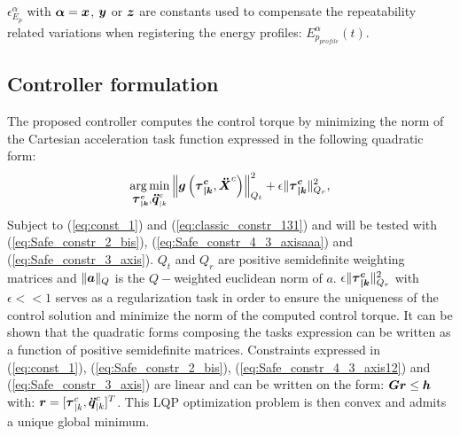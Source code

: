 \documentclass[letterpaper, 10 pt, conference]{ieeeconf}      %
\newcommand{\vect}[1]{\mbox{\boldmath${#1}$}}%
\DeclareMathOperator*{\argmin}{arg\,min}
\begin{document}
$\epsilon_{E_p}^{\alpha}$ with $\vect{\alpha} = \vect{x}$, $\vect{y}$ or $\vect{z}$ are constants used to compensate the repeatability related variations when registering the energy profiles: $E_{p_{profile}}^{\alpha}(t)$.
\subsection{Controller formulation}
\label{subsec:cntrl_frml}
The proposed controller computes the control torque by minimizing the norm of the Cartesian acceleration task function expressed in the following quadratic form: 
\begin{equation}
\argmin \limits_{\boldsymbol{\vect{\tau}_{|k}^{c}}, \vect{\ddot{q}}_{|k}^{c}}  \left\| \vect{g}\left(\boldsymbol{\vect{\tau}_{|k}^{c}},\vect{\ddot{X}}^c\right) \right\|_{Q_t}^2 + \epsilon  \| \boldsymbol{\vect{\tau}_{|k}^{c}} \|_{Q_r}^2,
\label{eq:ctrl_pb}
\end{equation}
Subject to (\ref{eq:const_1}) and (\ref{eq:classic_constr_131}) and will be tested with (\ref{eq:Safe_constr_2_bis}), (\ref{eq:Safe_constr_4_3_axisaaa}) and (\ref{eq:Safe_constr_3_axis}). $Q_t$ and $Q_r$ are  positive semidefinite weighting matrices and $\| \vect{a} \|_{Q}$ is the $Q-$weighted euclidean norm of $a$. $\epsilon  \| \boldsymbol{\vect{\tau}_{|k}^{c}} \|_{Q_r}^2$ with $\epsilon << 1$ serves as a regularization task in order to ensure the uniqueness of the control solution and minimize the norm of the computed control torque. It can be shown that the quadratic forms composing the tasks expression can be written as a function of positive semidefinite matrices. Constraints expressed in (\ref{eq:const_1}), (\ref{eq:Safe_constr_2_bis}), (\ref{eq:Safe_constr_4_3_axis12}) and (\ref{eq:Safe_constr_3_axis}) are linear and can be written on the form: $\vect{G} \vect{r} \leq \vect{h}$ with:  $\vect{r} = [\vect{\tau}_{|k}^{c}, \vect{\ddot{q}}_{|k}^{c}]^{T}$. This LQP optimization problem is then convex and admits a unique global minimum.
\end{document}
